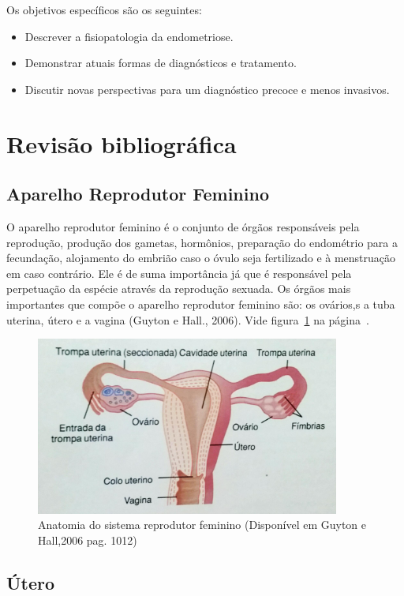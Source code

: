 \documentclass[12pt]{article} %
\begin{document}
Os objetivos específicos são os seguintes:

\begin{itemize}
\item Descrever a fisiopatologia da endometriose.
\item Demonstrar atuais formas de diagnósticos e tratamento.
\item Discutir novas perspectivas para um diagnóstico precoce e menos
invasivos.
\end{itemize}

\section{Revisão bibliográfica}

\subsection{Aparelho Reprodutor Feminino}

O aparelho reprodutor feminino é o conjunto de órgãos responsáveis
pela reprodução, produção dos gametas, hormônios, preparação do
endométrio para a fecundação, alojamento do embrião caso o óvulo seja
fertilizado e à menstruação em caso contrário. Ele é de suma
importância já que é responsável pela perpetuação da espécie através
da reprodução sexuada. Os órgãos mais importantes que compõe o
aparelho reprodutor feminino são: os ovários,s a tuba uterina, útero e
a vagina (Guyton e Hall., 2006). Vide figura~\ref{aparelho feminino}
na página~\pageref{aparelho feminino}.


\begin{figure}[h!]
\centering
\includegraphics[width=10cm]{utero.jpg}
\caption[Anatomia do sistema reprodutor feminino]{Anatomia do sistema reprodutor feminino (Disponível em Guyton e Hall,2006 pag. 1012)}
\label{aparelho feminino}
\end{figure}

\subsection{Útero}
\end{document}
